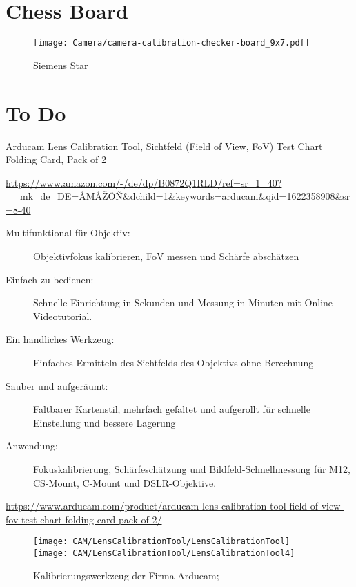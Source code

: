 \section{Chess Board}

\cite{Ntouskos:2007}
\cite{Ntouskos:2007a}
\cite{Ntouskos:2009}
\cite{Prokos:2012}

\begin{figure}
    \begin{center}
        \texttt{[image: Camera/camera-calibration-checker-board\_9x7.pdf]}
        
        \caption{Siemens Star}
    \end{center}    
\end{figure}






\section{To Do}

Arducam Lens Calibration Tool, Sichtfeld (Field of View, FoV) Test Chart Folding Card, Pack of 2

\url{https://www.amazon.com/-/de/dp/B0872Q1RLD/ref=sr_1_40?__mk_de_DE=ÅMÅŽÕÑ&dchild=1&keywords=arducam&qid=1622358908&sr=8-40}

\begin{description}
  \item[Multifunktional für Objektiv:] Objektivfokus kalibrieren, FoV messen und Schärfe abschätzen
  \item[Einfach zu bedienen:] Schnelle Einrichtung in Sekunden und Messung in Minuten mit Online-Videotutorial.
  \item[Ein handliches Werkzeug:] Einfaches Ermitteln des Sichtfelds des Objektivs ohne Berechnung
  \item[Sauber und aufgeräumt:] Faltbarer Kartenstil, mehrfach gefaltet und aufgerollt für schnelle Einstellung und bessere Lagerung
  \item[Anwendung:] Fokuskalibrierung, Schärfeschätzung und Bildfeld-Schnellmessung für M12, CS-Mount, C-Mount und DSLR-Objektive.

\end{description}
\url{https://www.arducam.com/product/arducam-lens-calibration-tool-field-of-view-fov-test-chart-folding-card-pack-of-2/}


\begin{figure}
  \begin{center}
    \texttt{[image: CAM/LensCalibrationTool/LensCalibrationTool]}
    \quad 
    \texttt{[image: CAM/LensCalibrationTool/LensCalibrationTool4]}
  
    \caption{Kalibrierungswerkzeug der Firma Arducam; \cite{Arducam:2021}}
  \end{center}    
\end{figure}


